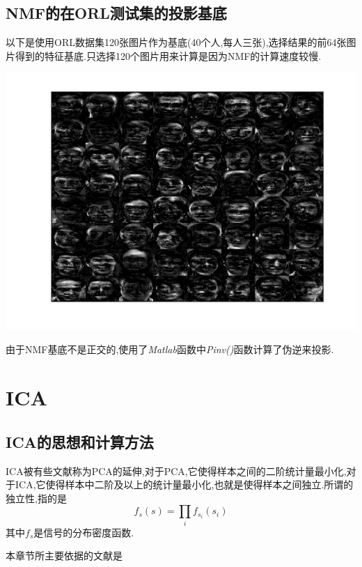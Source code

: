 \subsection{NMF的在ORL测试集的投影基底}
以下是使用ORL数据集120张图片作为基底(40个人,每人三张),选择结果的前64张图片得到的特征基底.只选择120个图片用来计算是因为NMF的计算速度较慢.
\begin{center}
\begin{minipage}[t]{\linewidth}
\center
{
\includegraphics[width=\textwidth]{Img/nmf_base.png} 
}
\end{minipage}
\medskip
\end{center}

由于NMF基底不是正交的,使用了\textit{Matlab}函数中\textit{Pinv()}函数计算了伪逆来投影.
\section{ICA}
\subsection{ICA的思想和计算方法}
ICA被有些文献称为PCA的延伸,对于PCA,它使得样本之间的二阶统计量最小化,对于ICA,它使得样本中二阶及以上的统计量最小化,也就是使得样本之间独立.所谓的独立性,指的是 \begin{equation}
		f_s(s) = \prod_i f_{s_i}(s_i)
	\end{equation}
	其中$f_s$是信号的分布密度函数.

本章节所主要依据的文献是\cite{icafordummies, draper2003recognizing, vaseghi2006principal, langlois2010introduction, hyvarinen2000independent, awasthyanalysis, khaparde2008fastica}\newline


